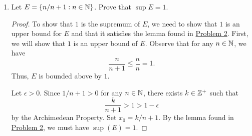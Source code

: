\documentclass[11pt,a4paper]{article}
\begin{document}
\begin{enumerate}
\item Let \( E  = \{ n / n + 1 : n \in \mathbb{N}  \}  \). Prove that \( \sup E  = 1  \). 
    \begin{proof}
    To show that \( 1  \) is the supremum of \( E  \), we need to show that \( 1  \) is an upper bound for \( E  \) and that it satisfies the lemma found in {\hyperref[Problem 2]{Problem 2}}. First, we will show that \( 1  \) is an upper bound of \( E  \). Observe that for any \( n \in \mathbb{N}  \), we have  
    \[  \frac{ n  }{  n + 1  }  \leq \frac{  n }{ n }  = 1.  \]
    Thus, \( E  \) is bounded above by \( 1 \). 

    Let \( \epsilon > 0  \). Since \( 1 / n + 1 > 0   \) for any \( n \in \mathbb{N} \), there exists \( k \in \mathbb{Z}^{+} \) such that  
    \[  \frac{ k  }{ n  + 1  }  > 1 > 1 - \epsilon \]
    by the Archimedean Property. Set \( {x}_{0} = k / n +1  \). By the lemma found in {\hyperref[Problem 2]{Problem 2}}, we must have \( \sup(E) = 1  \).  
    

     \end{proof}


\end{enumerate}
\end{document}
